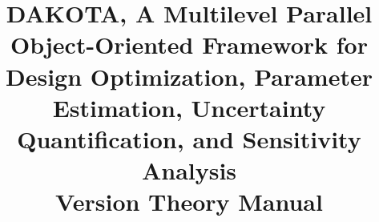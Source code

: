 \documentclass[ps2pdf,11pt,report]{SANDreport}
\title{DAKOTA, A Multilevel Parallel Object-Oriented Framework for 
Design Optimization, Parameter Estimation, Uncertainty Quantification, 
and Sensitivity Analysis\\\vspace{5mm}Version \DakotaVersion\space Theory Manual}
\author{\DakotaAuthorLong}
\begin{document}

\maketitle

\begin{abstract}
\DakotaAbstractShared
\DakotaAbstractTheory
\end{abstract}


\SANDmain 






\begin{SANDdistribution}[NM]





\end{SANDdistribution}

\end{document}
